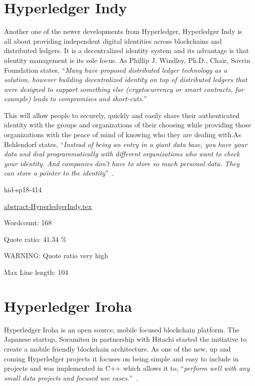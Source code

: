 \section{Hyperledger Indy}


Another one of the newer developments from Hyperledger, Hyperledger Indy 
is all about providing independent digital identities across blockchains 
and distributed ledgers. It is a decentralized identity system and its 
advantage is that identity management is its sole focus. 
As Phillip J. Windley, Ph.D., Chair, Sovrin Foundation states,  
\color{blue}``\emph{Many have proposed distributed ledger technology as a solution, 
however building decentralized identity on top of distributed ledgers 
that were designed to support something else (cryptocurrency or smart contracts, 
for example) leads to compromises and short-cuts.}''\color{black}~\cite{hid-sp18-414-Windley}

This will allow people to securely, quickly and easily share their authenticated 
identity with the groups and organizations of their choosing while providing those 
organizations with the peace of mind of knowing who they are dealing with.As Behlendorf 
states, \color{blue}``\emph{Instead of being an entry in a giant data base, you have your data and deal 
programmatically with different organizations who want to check your identity. And 
companies don't have to store so much personal data. They can store a pointer to the 
identity}''\color{black}~\cite{hid-sp18-414-Behlendor}.


\begin{IU}

hid-sp18-414

\href{https://github.com/cloudmesh-community/hid-sp18-414/blob/master//technology/abstract-HyperledgerIndy.tex}{abstract-HyperledgerIndy.tex}

 

Wordcount: 168


Quote ratio: 41.34 \%

WARNING: Quote ratio very high
 
Max Line length: 104
\end{IU}

\section{Hyperledger Iroha}


Hyperledger Iroha is an open source, mobile focused blockchain
platform.  The Japanese startup, Soramitsu in partnership with Hitachi
started the initiative to create a mobile friendly blockchain
architecture. As one of the new, up and coming Hyperledger projects it
focuses on being simple and easy to include in projects and was
implemented in C++ which allows it to, \color{blue}``\emph{perform well with any small
data projects and focused use cases.}''\color{black}~\cite{hid-sp18-414-Behlendorf}.

